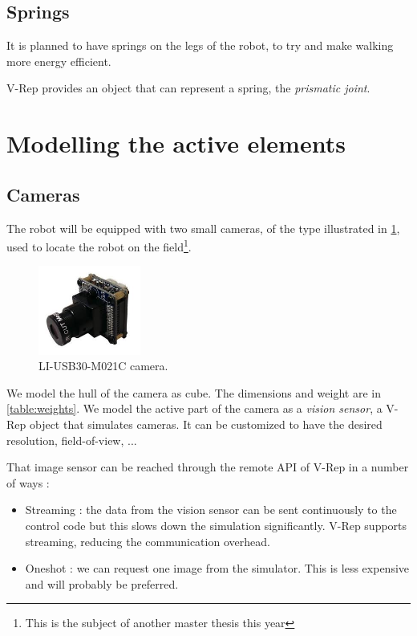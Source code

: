 \subsection{Springs}
It is planned to have springs on the legs of the robot, to try and make walking more energy efficient. 

V-Rep provides an object that can represent a spring, the \emph{prismatic joint}.

\section{Modelling the active elements}
\subsection{Cameras}
The robot will be equipped with two small cameras, of the type illustrated in \cref{fig:camera}, used to locate the robot on the field\footnote{This is the subject of another master thesis this year}. 

\begin{figure}[htp]
\center
    \includegraphics[width = 0.3\textwidth]{figures/li_cam}
    \caption{LI-USB30-M021C camera.}
    \label{fig:camera}
\end{figure}

We model the hull of the camera as cube. The dimensions and weight are in \cref{table:weights}. We model the active part of the camera as a \emph{vision sensor}, a V-Rep object that simulates cameras. It can be customized to have the desired resolution, field-of-view, ...

That image sensor can be reached through the remote API of V-Rep in a number of ways : \begin{itemize}
\item Streaming : the data from the vision sensor can be sent continuously to the control code but this slows down the simulation significantly. V-Rep supports streaming, reducing the communication overhead.
\item Oneshot : we can request one image from the simulator. This is less expensive and will probably be preferred.
\end{itemize} 

